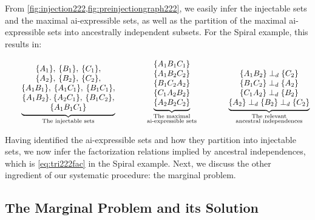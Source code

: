 \documentclass[aps,english,10pt,superscriptaddress,onecolumn,twoside,longbibliography,pra,floatfix,fleqn,nofootinbib]{revtex4-1}
\theoremstyle{definition}
\newcounter{example}[section]
\newcommand{\aindep}{\ensuremath{\perp_d}}
\DeclarePairedDelimiter{\braces}{\lbrace}{\rbrace}
\newcommand{\brackets}[1]{\braces*{#1}}
\begin{document}
From \cref{fig:injection222,fig:preinjectiongraph222}, we easily infer the injectable sets and the maximal ai-expressible sets, as well as the partition of the maximal ai-expressible sets into ancestrally independent subsets. For the Spiral example, this results in:
\begin{align}\label{eq:basicsetup222}
\qquad
{\underbrace{\begin{matrix}
\, \\
\brackets{A_1},\:\brackets{B_1},\:\brackets{C_1},\\
\brackets{A_2},\:\brackets{B_2},\:\brackets{C_2},\\
\brackets{A_1 B_1},\:\brackets{A_1 C_1},\:\brackets{B_1 C_1},\\
\brackets{A_1 B_2}.\:\brackets{A_2 C_1},\:\brackets{B_1 C_2},\\
\brackets{A_1 B_1 C_1}
\end{matrix}}_{\substack{\text{The injectable sets}}}}
\qquad\qquad
{\underbrace{\begin{matrix}
\brackets{A_1 B_1 C_1} \\
\brackets{A_1 B_2 C_2} \\
\brackets{B_1 C_2 A_2} \\
\brackets{C_1 A_2 B_2} \\
\brackets{A_2 B_2 C_2}
\end{matrix}}_{\substack{\text{The maximal}\\\text{ai-expressible sets}}}}
\qquad\qquad
{\underbrace{\begin{matrix}
\\
\{A_1 B_2\} \aindep \{ C_2\} \\
\{B_1 C_2\} \aindep \{ A_2\} \\
\{C_1 A_2\} \aindep \{ B_2\} \\
\{A_2\} \aindep \{B_2\} \aindep \{ C_2\}
\end{matrix}}_{\substack{\text{The relevant}\\\text{ancestral independences}}}}
\end{align}

Having identified the ai-expressible sets and how they partition into injectable sets, we now infer the factorization relations implied by ancestral independences, which is \cref{eq:tri222fac} in the Spiral example. Next, we discuss the other ingredient of our systematic procedure: the marginal problem.

\subsection{The Marginal Problem and its Solution}
\label{step:marginalsproblem}
\end{document}
